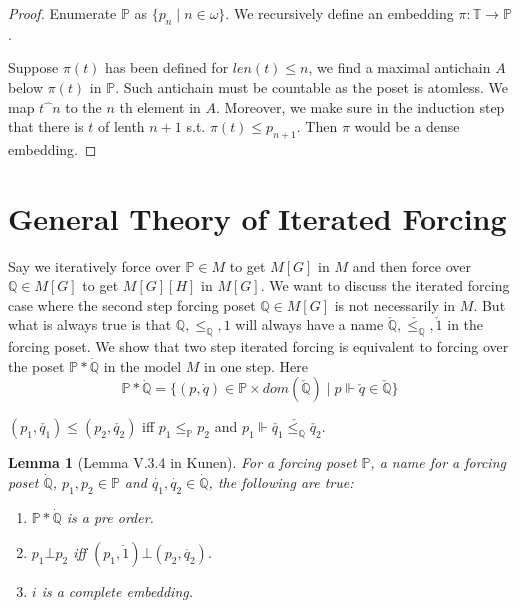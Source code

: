 \documentclass{article}
\newtheorem{lemma}{Lemma}
\newcommand{\bbP}{\mathbb{P}}
\newcommand{\bbQ}{\mathbb{Q}}
\begin{document}
\begin{proof}
    Enumerate $\bbP $ as $\{p_n\mid n\in \omega\}$. We recursively define an embedding $\pi:\mathbb{T}\to \bbP$.

    Suppose $\pi(t)$ has been defined for $len(t)\leq n$, we find a maximal antichain $A$ below $\pi(t)$ in $\bbP$. Such antichain must be countable as the poset is atomless. We map $t\widehat{\phantom{x}}n$ to the $n$ th element in $A$. Moreover, we make sure in the induction step that there is $t$ of lenth $n+1$ s.t. $\pi(t)\leq p_{n+1}$. Then $\pi$ would be a dense embedding.
\end{proof}

\section{General Theory of Iterated Forcing}

Say we iteratively force over $\bbP\in M$ to get $M[G]$ in $M$ and then force over $\bbQ\in M[G]$ to get $M[G][H]$ in $M[G]$. 
We want to discuss the iterated forcing case where the second step forcing poset $\bbQ\in M[G]$ is not necessarily in $M$. But what is always true is that $\bbQ, \leq_\bbQ,1$ will always have a name $\check{\bbQ},\check{\leq_\bbQ}, \check{1}$ in the forcing poset. We show that two step iterated forcing is equivalent to forcing over the poset $\mathbb{P}*\dot{\mathbb{Q}}$ in the model $M$ in one step. Here $$\mathbb{P}*\dot{\mathbb{Q}} = \{(p,\dot{q})\in \bbP\times dom(\check{\bbQ})\mid p\Vdash \check{q}\in \check{\bbQ}\} $$

$(p_1,\check{q_1})\leq (p_2,\check{q_2})$ iff $p_1\leq_\bbP p_2$ and $p_1\Vdash \check{q_1}\check{\leq_\bbQ} \check{q_2}$.

\begin{lemma}[Lemma V.3.4 in Kunen]
    For a forcing poset $\mathbb{P}$, a name for a forcing poset $\dot{\mathbb{Q}}$, $p_1,p_2\in \mathbb{P}$ and $\dot{q_1},\dot{q_2}\in \dot{\mathbb{Q}}$, the following are true:

    \begin{enumerate}
        \item $\mathbb{P}*\dot{\mathbb{Q}}$ is a pre order.
        \item $p_1\bot p_2$ iff $(p_1,\dot{1})\bot (p_2, \dot{q_2})$.
        \item $i$ is a complete embedding.
    \end{enumerate}
\end{lemma}
\end{document}
